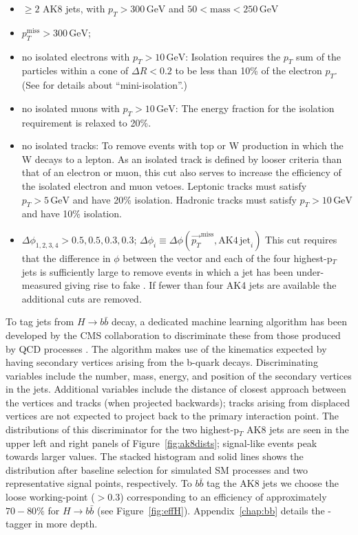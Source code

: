 \begin{itemize}
\item $\geq2$ AK8 jets, with $p_{T} > 300\,\mathrm{GeV}$ and $50 < \mathrm{mass} < 250\,\mathrm{GeV}$
\item $p_{T}^{\mathrm{miss}} > 300\,\mathrm{GeV}$;
\item no isolated electrons with $p_{T}>10\,\textrm{GeV}$:\newline
Isolation requires the $p_{T}$ sum of the particles within a cone of $\Delta R < 0.2$ to be less than 10\% of the electron $p_{T}$. (See \cite{miniiso} for details about ``mini-isolation''.)
\item no isolated muons with $p_{T}>10\,\textrm{GeV}$:\newline
The energy fraction for the isolation requirement is relaxed to 20\%.
\item no isolated tracks:\newline
To remove events with top or W production in which the W decays to a lepton. As an isolated track is defined by looser criteria than that of an electron or muon, this cut also serves to increase the efficiency of the isolated electron and muon vetoes. Leptonic tracks must satisfy $p_{T}>5\,\textrm{GeV}$ and have 20\% isolation. Hadronic tracks must satisfy $p_{T}>10\,\textrm{GeV}$ and have 10\% isolation.
\item $\Delta\phi_{1, 2, 3, 4} > 0.5, 0.5, 0.3, 0.3$; $\Delta\phi_{i}\equiv \Delta\phi(\vec{p_{T}}^{\mathrm{miss}}, \mathrm{AK4\,jet}_{i})$\newline
This cut requires that the difference in $\phi$ between the \ptmiss vector and each of the four highest-p$_{T}$ jets is sufficiently large to remove events in which a jet has been under-measured giving rise to fake \ptmiss. If fewer than four AK4 jets are available the additional cuts are removed.
\end{itemize}

To tag jets from $H \rightarrow b\bar{b}$ decay, a dedicated machine learning algorithm has been developed by the CMS collaboration to discriminate these from those produced by QCD processes \cite{bbtagger}. The algorithm makes use of the kinematics expected by having secondary vertices arising from the b-quark decays. Discriminating variables include the number, mass, energy, and position of the secondary vertices in the jets. Additional variables include the distance of closest approach between the vertices and tracks (when projected backwards); tracks arising from displaced vertices are not expected to project back to the primary interaction point. The distributions of this discriminator for the two highest-p$_{T}$ AK8 jets are seen in the upper left and right panels of Figure~\ref{fig:ak8dists}; signal-like events peak towards larger values. The stacked histogram and solid lines shows the distribution after baseline selection for simulated SM processes and two representative signal points, respectively. To $b\bar{b}$ tag the AK8 jets we choose the loose working-point ($>$0.3) corresponding to an efficiency of approximately $70-80\%$ for $H \rightarrow b \bar{b}$ (see Figure~\ref{fig:effH}). Appendix~\ref{chap:bb} details the \bbbar-tagger in more depth. 


